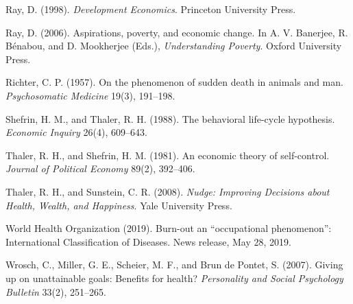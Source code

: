 Ray, D. (1998). \emph{Development Economics}. Princeton University Press.

Ray, D. (2006). Aspirations, poverty, and economic change. In A. V. Banerjee, R. B\'enabou, and D. Mookherjee (Eds.), \emph{Understanding Poverty}. Oxford University Press.

Richter, C. P. (1957). On the phenomenon of sudden death in animals and man. \emph{Psychosomatic Medicine} 19(3), 191--198.

Shefrin, H. M., and Thaler, R. H. (1988). The behavioral life-cycle hypothesis. \emph{Economic Inquiry} 26(4), 609--643.

Thaler, R. H., and Shefrin, H. M. (1981). An economic theory of self-control. \emph{Journal of Political Economy} 89(2), 392--406.

Thaler, R. H., and Sunstein, C. R. (2008). \emph{Nudge: Improving Decisions about Health, Wealth, and Happiness}. Yale University Press.

World Health Organization (2019). Burn-out an ``occupational phenomenon'': International Classification of Diseases. News release, May 28, 2019.

Wrosch, C., Miller, G. E., Scheier, M. F., and Brun de Pontet, S. (2007). Giving up on unattainable goals: Benefits for health? \emph{Personality and Social Psychology Bulletin} 33(2), 251--265.
